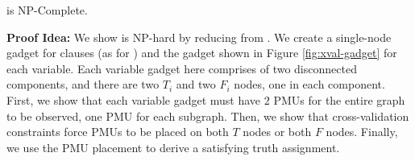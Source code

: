 \begin{theorem}
\xval is NP-Complete. %
\label{thm:npc-xval}
\end{theorem}

%
%

%

{\bf Proof Idea:}   We show \xval is NP-hard by reducing from \sats.  
We create a single-node gadget for clauses (as for \fulls) and the gadget shown in Figure \ref{fig:xval-gadget} for each variable. Each variable gadget here comprises of two disconnected components, 
and there are two $T_i$ and two $F_i$ nodes, one in each component. First, we show that each variable gadget must have $2$ PMUs for the entire graph to be observed, one PMU for each subgraph.
Then, we show that cross-validation constraints force PMUs to be placed on both $T$ nodes or both $F$ nodes.  Finally, we use the PMU placement to derive a satisfying \sat truth assignment.
 
